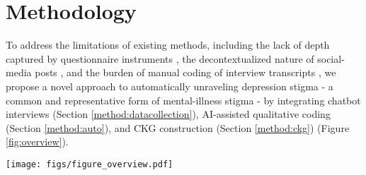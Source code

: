 \section{Methodology}
\label{sec:method}



To address the limitations of existing methods, including the lack of depth captured by questionnaire instruments \cite{comparison_taherdoost_2022}, the decontextualized nature of social-media posts \cite{social_media_decontext_boyd_2012}, and the burden of manual coding of interview transcripts \cite{coding_manual_saldana_2016}, we propose a novel approach to automatically unraveling depression stigma - a common and representative form of mental-illness stigma - by integrating chatbot interviews (Section \ref{method:datacollection}), AI-assisted qualitative coding (Section \ref{method:auto}), and CKG construction (Section \ref{method:ckg}) (Figure \ref{fig:overview}).


\begin{figure*}
    \centering
    \texttt{[image: figs/figure\_overview.pdf]}
    \caption{Methodology overview. In this work, we propose this approach to deconstruct depression stigma through two main phases: \textit{I. AI-assisted Data Collection and Analysis Pipeline} (RQ1) and \textit{II. Causal Knowledge Graph Construction} (RQ2).}
    \label{fig:overview}
\end{figure*}



